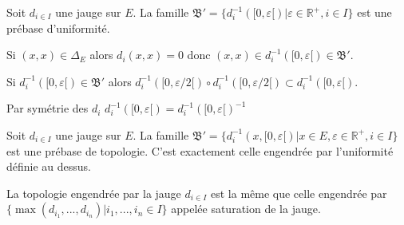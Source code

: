 \documentclass[a4paper, 11pt, french]{book}
\newenvironment{itemise}{\itemize}{\enditemize}
\theoremstyle{plain} %
\theoremstyle{definition} %
\theoremstyle{remark} %
\newcommand{\1}{\mathds{1}}
\newcommand{\inv}[1]{#1^{-1}}
\newcommand{\R}{\mathbb{R}}
\begin{document}
\proposition
Soit $d_{i\in I}$ une jauge sur $E$.
La famille $\mathfrak{B}'=\{\inv{d_i}([0, \varepsilon[)|\varepsilon\in\R^+, i\in I\}$ est une prébase d'uniformité.
\demonstration
\begin{itemise}
	\item Si $(x, x)\in\Delta_E$ alors $d_i(x, x)=0$ donc $(x, x)\in\inv{d_i}([0, \varepsilon[)\in\mathfrak{B}'$.
	\item Si $\inv{d_i}([0, \varepsilon[)\in\mathfrak{B}'$ alors $\inv{d_i}([0, \varepsilon/2[)\circ \inv{d_i}([0, \varepsilon/2[)\subset\inv{d_i}([0, \varepsilon[)$.
	\item Par symétrie des $d_i$ $\inv{d_i}([0, \varepsilon[)=\inv{\inv{d_i}([0, \varepsilon[)}$
\end{itemise}

\proposition
Soit $d_{i\in I}$ une jauge sur $E$.
La famille $\mathfrak{B}'=\{\inv{d_i}(x, [0, \varepsilon[)|x\in E, \varepsilon\in\R^+, i\in I\}$ est une prébase de topologie.
C'est exactement celle engendrée par l'uniformité définie au dessus.
\demonstration

\proposition
La topologie engendrée par la jauge $d_{i\in I}$ est la même que celle engendrée par $\{\max(d_{i_1}, ..., d_{i_n})|i_1, ..., i_n\in I\}$ appelée saturation de la jauge.
\demonstration
\end{document}
